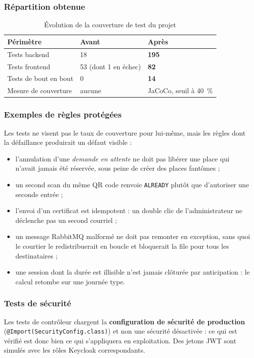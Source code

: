 \subsubsection{Répartition obtenue}
\begin{table}[H]\centering\renewcommand{\arraystretch}{1.25}
\begin{tabular}{|p{5cm}|p{2.6cm}|p{2.6cm}|}\hline
\rowcolor{gray!15}\textbf{Périmètre} & \textbf{Avant} & \textbf{Après} \\ \hline
Tests backend & 18 & \textbf{195} \\ \hline
Tests frontend & 53 (dont 1 en échec) & \textbf{82} \\ \hline
Tests de bout en bout & 0 & \textbf{14} \\ \hline
Mesure de couverture & aucune & JaCoCo, seuil à 40~\% \\ \hline
\end{tabular}
\caption{Évolution de la couverture de test du projet}\label{tab:devops-tests}
\end{table}

\subsubsection{Exemples de règles protégées}
Les tests ne visent pas le taux de couverture pour lui-même, mais les règles dont la
défaillance produirait un défaut visible :

\begin{itemize}
  \item l'annulation d'une \emph{demande en attente} ne doit pas libérer une place qui
        n'avait jamais été réservée, sous peine de créer des places fantômes ;
  \item un second scan du même QR code renvoie \texttt{ALREADY} plutôt que d'autoriser
        une seconde entrée ;
  \item l'envoi d'un certificat est idempotent : un double clic de l'administrateur ne
        déclenche pas un second courriel ;
  \item un message RabbitMQ malformé ne doit pas remonter en exception, sans quoi le
        courtier le redistribuerait en boucle et bloquerait la file pour tous les
        destinataires ;
  \item une session dont la durée est illisible n'est jamais clôturée par anticipation :
        le calcul retombe sur une journée type.
\end{itemize}

\subsubsection{Tests de sécurité}
Les tests de contrôleur chargent la \textbf{configuration de sécurité de production}
(\texttt{@Import(SecurityConfig.class)}) et non une sécurité désactivée : ce qui est
vérifié est donc bien ce qui s'appliquera en exploitation. Des jetons JWT sont simulés
avec les rôles Keycloak correspondants.

